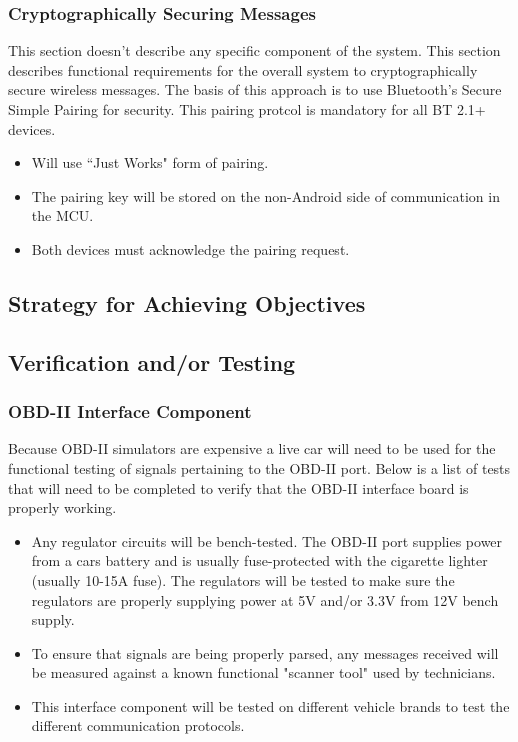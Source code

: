 \documentclass[12pt,letterpaper]{article}
\begin{document}
\subsubsection{Cryptographically Securing Messages}
This section doesn't describe any specific component of the system. This section describes functional requirements for the overall system to cryptographically secure wireless messages. The basis of this approach is to use Bluetooth's Secure Simple Pairing for security. This pairing protcol is mandatory for all BT 2.1+ devices.

\begin{itemize}
	\item Will use ``Just Works" form of pairing.
	\item The pairing key will be stored on the non-Android side of communication in the MCU.
	\item Both devices must acknowledge the pairing request.
\end{itemize}

\subsection{Strategy for Achieving Objectives}

\subsection{Verification and/or Testing}
\subsubsection{OBD-II Interface Component}
Because OBD-II simulators are expensive a live car will need to be used for the functional testing of signals pertaining to the OBD-II port. Below is a list of tests that will need to be completed to verify that the OBD-II interface board is properly working.

\begin{itemize}
\item Any regulator circuits will be bench-tested. The OBD-II port supplies power from a cars battery and is usually fuse-protected with the cigarette lighter (usually 10-15A fuse). The regulators will be tested to make sure the regulators are properly supplying power at 5V and/or 3.3V from 12V bench supply.
\item To ensure that signals are being properly parsed, any messages received will be measured against a known functional "scanner tool" used by technicians.
\item This interface component will be tested on different vehicle brands to test the different communication protocols.
\end{itemize}
\end{document}
